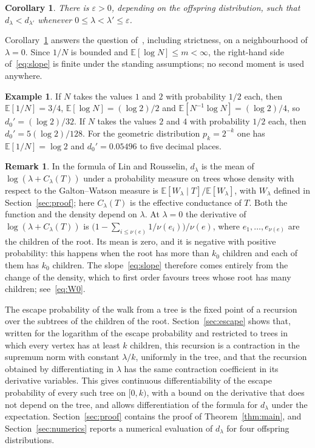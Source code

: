 \documentclass[11pt]{amsart}
\newtheorem{corollary}[theorem]{Corollary}
\theoremstyle{definition}
\newtheorem{example}[theorem]{Example}
\newtheorem{remark}[theorem]{Remark}
\newcommand{\E}{\mathbb{E}}
\newcommand{\eps}{\varepsilon}
\begin{document}
\begin{corollary}\label{cor:mono}
There is $\eps>0$, depending on the offspring distribution, such that $d_\lambda<d_{\lambda'}$ whenever
$0\le\lambda<\lambda'\le\eps$.
\end{corollary}

Corollary~\ref{cor:mono} answers the question of~\cite{LPP97}, including strictness, on a neighbourhood of
$\lambda=0$. Since $1/N$ is bounded and $\E[\log N]\le m<\infty$, the right-hand side of~\eqref{eq:slope} is
finite under the standing assumptions; no second moment is used anywhere.

\begin{example}
If $N$ takes the values $1$ and $2$ with probability $1/2$ each, then $\E[1/N]=3/4$, $\E[\log N]=(\log 2)/2$ and
$\E[N^{-1}\log N]=(\log2)/4$, so $d_0'=(\log 2)/32$. If $N$ takes the values $2$ and $4$ with probability $1/2$
each, then $d_0'=5(\log2)/128$. For the geometric distribution $p_k=2^{-k}$ one has $\E[1/N]=\log 2$ and
$d_0'=0.05496$ to five decimal places.
\end{example}

\begin{remark}\label{rem:tilt}
In the formula of Lin and Rousselin, $d_\lambda$ is the mean of $\log(\lambda+C_\lambda(T))$ under a probability
measure on trees whose density with respect to the Galton--Watson measure is $\E[W_\lambda\mid T]/\E[W_\lambda]$,
with $W_\lambda$ defined in Section~\ref{sec:proof}; here
$C_\lambda(T)$ is the effective conductance of $T$. Both the function and the density depend on $\lambda$. At
$\lambda=0$ the derivative of $\log(\lambda+C_\lambda(T))$ is
$\bigl(1-\sum_{i\le\nu(e)}1/\nu(e_i)\bigr)/\nu(e)$, where $e_1,\dots,e_{\nu(e)}$ are the children of the root.
Its mean is zero, and it is negative with positive probability: this happens when the root has more than
$k_0$ children and each of them has $k_0$ children. The slope~\eqref{eq:slope} therefore comes entirely from the
change of the density, which to first order favours trees whose root has many children; see~\eqref{eq:W0}.
\end{remark}

The escape probability of the walk from a tree is the fixed point of a recursion over the subtrees of the
children of the root. Section~\ref{sec:escape} shows that, written for the logarithm of the escape probability
and restricted to trees in which every vertex has at least $k$ children, this recursion is a contraction in the
supremum norm with constant $\lambda/k$, uniformly in the tree, and that the recursion obtained by
differentiating in $\lambda$ has the same contraction coefficient in its derivative variables. This gives continuous differentiability of the escape probability of
every such tree on $[0,k)$, with a bound on the derivative that does not depend on the tree, and allows
differentiation of the formula for $d_\lambda$ under the expectation. Section~\ref{sec:proof} contains the proof
of Theorem~\ref{thm:main}, and Section~\ref{sec:numerics} reports a numerical evaluation of $d_\lambda$ for four
offspring distributions.
\end{document}
